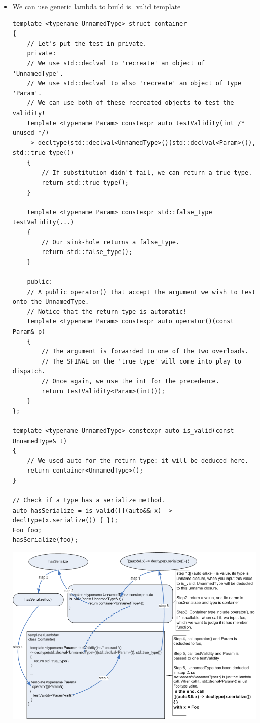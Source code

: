 \documentclass[a4paper,11pt,twoside]{book}
\begin{document}
\begin{itemize}
\begin{itemize}
	\item We can use generic lambda to build is\_valid template
	
\begin{lstlisting}[numbers=none]
template <typename UnnamedType> struct container
{
	// Let's put the test in private.
	private:
	// We use std::declval to 'recreate' an object of 'UnnamedType'.
	// We use std::declval to also 'recreate' an object of type 'Param'.
	// We can use both of these recreated objects to test the validity!
	template <typename Param> constexpr auto testValidity(int /* unused */)
	-> decltype(std::declval<UnnamedType>()(std::declval<Param>()), std::true_type())
	{
		// If substitution didn't fail, we can return a true_type.
		return std::true_type();
	}
	
	template <typename Param> constexpr std::false_type testValidity(...)
	{
		// Our sink-hole returns a false_type.
		return std::false_type();
	}
	
	public:
	// A public operator() that accept the argument we wish to test onto the UnnamedType.
	// Notice that the return type is automatic!
	template <typename Param> constexpr auto operator()(const Param& p)
	{
		// The argument is forwarded to one of the two overloads.
		// The SFINAE on the 'true_type' will come into play to dispatch.
		// Once again, we use the int for the precedence.
		return testValidity<Param>(int());
	}
};

template <typename UnnamedType> constexpr auto is_valid(const UnnamedType& t) 
{
	// We used auto for the return type: it will be deduced here.
	return container<UnnamedType>();
}

// Check if a type has a serialize method.
auto hasSerialize = is_valid([](auto&& x) -> decltype(x.serialize()) { });
Foo foo;
hasSerialize(foo);
\end{lstlisting}

\begin{center}
	\includegraphics[scale=0.59]{pics/is_valid.png}
\end{center}




\end{itemize}
\end{itemize}
\end{document}
